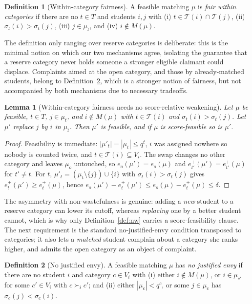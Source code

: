 \documentclass[a4paper,twoside]{article}
\newtheorem{lemma}{Lemma}
\theoremstyle{definition}
\newtheorem{definition}{Definition}
\renewcommand{\T}{\mathcal{T}}
\begin{document}
\begin{definition}[Within-category fairness]
\label{def:fair}
A feasible matching $\mu$ is \emph{fair within categories} if there are no $t\in T$ and students $i,j$ with (i) $t\in\T(i)\cap\T(j)$, (ii) $\sigma_t(i)>\sigma_t(j)$, (iii) $j\in\mu_t$, and (iv) $i\notin M(\mu)$.
\end{definition}

The definition only ranging over reserve categories is deliberate: this is the minimal notion on which our two mechanisms agree, isolating the guarantee that a reserve category never holds someone a stronger eligible claimant could displace. Complaints aimed at the open category, and those by already-matched students, belong to Definition~\ref{def:nje}, which is a stronger notion of fairness, but not accompanied by both mechanisms due to necessary tradeoffs.

\begin{lemma}[Within-category fairness needs no score-relative weakening]
\label{lem:fair-sf}
Let $\mu$ be feasible, $t\in T$, $j\in\mu_t$, and $i\notin M(\mu)$ with $t\in\T(i)$ and $\sigma_t(i)>\sigma_t(j)$. Let $\mu'$ replace $j$ by $i$ in $\mu_t$. Then $\mu'$ is feasible, and if $\mu$ is score-feasible so is $\mu'$.
\end{lemma}

\begin{proof}
Feasibility is immediate: $|\mu'_t|=|\mu_t|\le q^t$, $i$ was assigned nowhere so nobody is counted twice, and $t\in\T(i)\subseteq V_i$. The swap changes no other category and leaves $\mu_o$ untouched, so $e_o(\mu')=e_o(\mu)$ and $e_{t'}^+(\mu')=e_{t'}^+(\mu)$ for $t'\neq t$. For $t$, $\mu'_t=(\mu_t\setminus\{j\})\cup\{i\}$ with $\sigma_t(i)>\sigma_t(j)$ gives $e_t^+(\mu')\ge e_t^+(\mu)$, hence $e_o(\mu')-e_t^+(\mu')\le e_o(\mu)-e_t^+(\mu)\le\delta$.
\end{proof}

The asymmetry with non-wastefulness is genuine: adding a \emph{new} student to a reserve category can lower its cutoff, whereas \emph{replacing} one by a better student cannot, which is why only Definition~\ref{def:nw} carries a score-feasibility clause. The next requirement is the standard no-justified-envy condition transposed to categories; it also lets a \emph{matched} student complain about a category she ranks higher, and admits the open category as an object of complaint.

\begin{definition}[No justified envy]
\label{def:nje}
A feasible matching $\mu$ has \emph{no justified envy} if there are no student $i$ and category $c\in V_i$ with (i) either $i\notin M(\mu)$, or $i\in\mu_{c'}$ for some $c'\in V_i$ with $c\succ_i c'$; and (ii) either $|\mu_c|<q^c$, or some $j\in\mu_c$ has $\sigma_c(j)<\sigma_c(i)$.
\end{definition}
\end{document}
